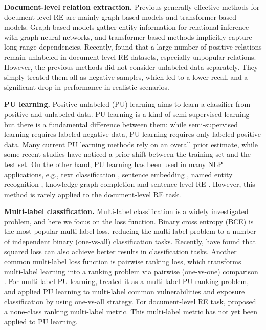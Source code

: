 \documentclass[11pt]{article}
\begin{document}
\textbf{Document-level relation extraction.} \enspace Previous generally effective methods for document-level RE are mainly graph-based models and transformer-based models. Graph-based models \citep{nan-etal-2020-reasoning,li-etal-2020-graph,zeng-etal-2020-double, zeng-etal-2021-sire, Xu_Chen_Zhao_2021} gather entity information for relational inference with graph neural networks, and transformer-based methods \citep{Zhou_Huang_Ma_Huang_2021, Xu_Wang_Lyu_Zhu_Mao_2021,ijcai2021p551,tan-etal-2022-document} implicitly capture long-range dependencies. Recently, \citep{huang-etal-2022-recommend, tan2022revisiting} found that a large number of positive relations remain unlabeled in document-level RE datasets, especially unpopular relations. However, the previous methods did not consider unlabeled data separately. They simply treated them all as negative samples, which led to a lower recall and a significant drop in performance in realistic scenarios.

\textbf{PU learning.} \enspace Positive-unlabeled (PU) learning \citep{10.1145/1401890.1401920,NIPS2014_35051070,pmlr-v37-plessis15,NIPS2017_7cce53cf} aims to learn a classifier from positive and unlabeled data. PU learning is a kind of semi-supervised learning but there is a fundamental difference between them: while semi-supervised learning requires labeled negative data, PU learning requires only labeled positive data. Many current PU learning methods rely on an overall prior estimate, while some recent studies \citep{charoenphakdee2019positive, nakajima2021positive} have noticed a prior shift between the training set and the test set. \enspace On the other hand, PU learning has been used in many NLP applications, e.g., text classification \citep{10.5555/1630659.1630746}, sentence embedding \citep{cao-etal-2021-pause}, named entity recognition \citep{peng-etal-2019-distantly, zhou-etal-2022-distantly}, knowledge graph completion \citep{ijcai2022p312} and sentence-level RE \citep{He_Chen_Wang_Zhang_Wang_Zhang_2020}. However, this method is rarely applied to the document-level RE task.

\textbf{Multi-label classification.} \enspace Multi-label classification is a widely investigated problem, and here we focus on the loss function. Binary cross entropy (BCE) is the most popular multi-label loss, reducing the multi-label problem to a number of independent binary (one-vs-all) classification tasks. Recently, \citep{hui2020evaluation} have found that squared loss can also achieve better results in classification tasks. Another common multi-label loss function is pairwise ranking loss, which transforms multi-label learning into a ranking problem via pairwise (one-vs-one) comparison \citep{furnkranz2008multilabel, Li_2017_CVPR}. \enspace 
For multi-label PU learning, \citep{Kanehira_2016_CVPR} treated it as a multi-label PU ranking problem, and \citep{9724274} applied PU learning to multi-label common vulnerabilities and exposure classification by using one-vs-all strategy. For document-level RE task, \citep{ijcai2022p630} proposed a none-class ranking multi-label metric. This multi-label metric has not yet been applied to PU learning.
\end{document}
